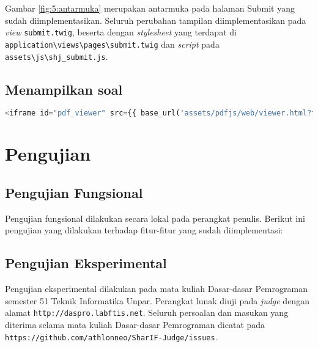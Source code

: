 Gambar \ref{fig:5:antarmuka} merupakan antarmuka pada halaman Submit yang sudah diimplementasikan. Seluruh perubahan tampilan diimplementasikan pada \textit{view} \verb|submit.twig|, beserta dengan \textit{stylesheet} yang terdapat di \verb|application\views\pages\submit.twig| dan \textit{script} pada \verb|assets\js\shj_submit.js|.

\subsection{Menampilkan soal}
\label{subsec:5:soal}

\begin{lstlisting}[language=php, caption=Penambahan \texttt{iframe} untuk PDF.js, label=kode:5:pdfjs]
    <iframe id="pdf_viewer" src={{ base_url('assets/pdfjs/web/viewer.html?file=') ~ site_url('assignments/pdf/' ~ user.selected_assignment.id ~ '/null/true')}} ></iframe>
\end{lstlisting}


\section{Pengujian}
\label{sec:5:pengujian}

\subsection{Pengujian Fungsional}
\label{subsec:5:fungsional}

Pengujian fungsional dilakukan secara lokal pada perangkat penulis. Berikut ini pengujian yang dilakukan terhadap fitur-fitur yang sudah diimplementasi:


\subsection{Pengujian Eksperimental}
\label{subsec:5:eksperimental}

Pengujian eksperimental dilakukan pada mata kuliah Dasar-dasar Pemrograman semester 51 Teknik Informatika Unpar. Perangkat lunak diuji pada \textit{judge} dengan alamat \verb|http://daspro.labftis.net|. Seluruh persoalan dan masukan yang diterima selama mata kuliah Dasar-dasar Pemrograman dicatat pada \verb|https://github.com/athlonneo/SharIF-Judge/issues|.



